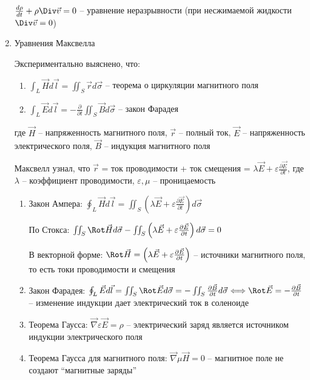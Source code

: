 \documentclass[12pt]{article}
\begin{document}
\begin{enumerate}[label*=\arabic** ]
        $\frac{d\rho}{dt} + \rho \Div \vec{v} = 0$ -- уравнение неразрывности (при несжимаемой жидкости $\Div \vec{v} = 0$)

        \item Уравнения Максвелла

        Экспериментально выяснено, что: 
        
        \begin{enumerate}
            \item $\int_L \vec{H} d\vec{l} = \iint_S \vec{r}d\vec{\sigma}$ -- теорема о циркуляции магнитного поля

            \item $\int_L \vec{E} d\vec{l} = -\frac{\partial}{\partial t} \iint_S \vec{B}d\vec{\sigma}$ -- закон Фарадея
        \end{enumerate}

        где $\vec{H}$ -- напряженность магнитного поля, $\vec{r}$ -- полный ток, $\vec{E}$ -- напряженность электрического поля, $\vec{B}$ -- индукция магнитного поля

        Максвелл узнал, что $\vec{r}$ = ток проводимости + ток смещения = $\lambda \vec{E} + \varepsilon \frac{\partial \vec{E}}{\partial t}$, где $\lambda$ -- коэффициент проводимости, $\varepsilon, \mu$ -- проницаемость

        \begin{enumerate}
            \item Закон Ампера: $\oint_L \vec{H} d\vec{l} = \iint_S \left(\lambda \vec{E} + \varepsilon \frac{\partial \vec{E}}{\partial t}\right) d\vec{\sigma}$

            По \Ths Стокса: $\iint_S \Rot \vec{H} d\vec{\sigma} - \iint_S \left(\lambda \vec{E} + \varepsilon \frac{\partial \vec{E}}{\partial t}\right) d\vec{\sigma} = 0$

            В векторной форме: $\Rot \vec{H} = \left(\lambda \vec{E} + \varepsilon \frac{\partial \vec{E}}{\partial t}\right)$ -- источники магнитного поля, то есть токи проводимости и смещения

            \item Закон Фарадея: $\oint_L \vec{E}d\vec{l} = \iint_S \Rot \vec{E}d\vec{\sigma} = -\iint_S \frac{\partial \vec{B}}{\partial t}d\vec{\sigma} \Longleftrightarrow
            \Rot \vec{E} = -\frac{\partial \vec{B}}{\partial t}$ -- изменение индукции дает электрический ток в соленоиде

            \item Теорема Гаусса: $\vec\nabla \varepsilon \vec{E} = \rho$ -- электрический заряд является источником индукции электрического поля

            \item Теорема Гаусса для магнитного поля: $\vec\nabla \mu \vec{H} = 0$ -- магнитное поле не создают \enquote{магнитные заряды}
        \end{enumerate}
    \end{enumerate}
\end{document}
